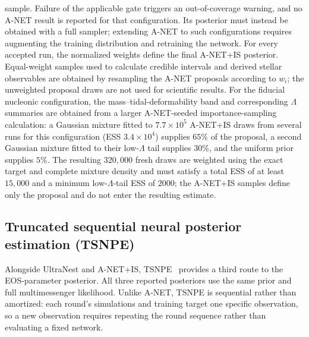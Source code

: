 \documentclass[aps,prd,twocolumn,superscriptaddress,nofootinbib,longbibliography]{revtex4-2}
\begin{document}
sample. Failure of the applicable gate triggers an out-of-coverage warning, and no
A-NET result is reported for that
configuration. Its posterior must instead be obtained with a full sampler;
extending A-NET to such configurations requires augmenting the training
distribution and retraining the network. For every accepted run, the
normalized weights define the final A-NET+IS posterior. Equal-weight samples
used to calculate credible intervals and derived stellar observables are
obtained by resampling the A-NET proposals according to $w_i$; the
unweighted proposal draws are not used for scientific
results. For the fiducial nucleonic configuration, the
mass--tidal-deformability band and corresponding $\Lambda$ summaries are
obtained from a larger A-NET-seeded importance-sampling calculation: a Gaussian
mixture fitted to $7.7\times10^{5}$ A-NET+IS draws from several runs for this
configuration (ESS $3.4\times10^{4}$) supplies $65\%$ of the proposal,
a second Gaussian mixture fitted to their low-$\Lambda$ tail supplies $30\%$,
and the uniform prior supplies $5\%$. The resulting $320{,}000$ fresh draws
are weighted using the exact target and complete mixture density and must
satisfy a total ESS of at least $15{,}000$ and a minimum low-$\Lambda$-tail
ESS of $2000$; the A-NET+IS samples define only the proposal and do not enter
the resulting estimate.

\subsection{Truncated sequential neural posterior estimation
(TSNPE)}
\label{sec:method:tsnpe}

Alongside UltraNest and A-NET+IS,
TSNPE~\cite{Deistler:2022tsnpe} provides a third route to the EOS-parameter
posterior. All three reported posteriors use the same prior and full
multimessenger likelihood. Unlike A-NET, TSNPE is sequential rather than
amortized: each round's simulations and training target one specific
observation, so a new observation requires repeating the round sequence
rather than evaluating a fixed network.
\end{document}

